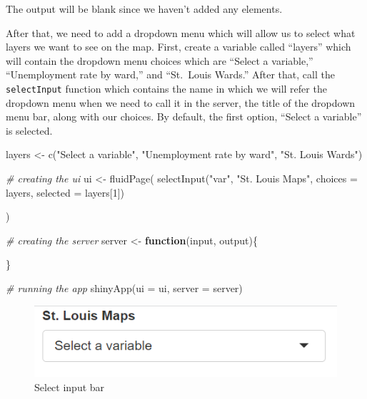 \documentclass[
  krantz2]{krantz}
\makeatletter
\newenvironment{Shaded}{\begin{snugshade}}{\end{snugshade}}
\newcommand{\AttributeTok}[1]{\textcolor[rgb]{0.61,0.61,0.61}{#1}}
\newcommand{\CommentTok}[1]{\textcolor[rgb]{0.37,0.37,0.37}{\textit{#1}}}
\newcommand{\ControlFlowTok}[1]{\textcolor[rgb]{0.27,0.27,0.27}{\textbf{#1}}}
\newcommand{\DecValTok}[1]{\textcolor[rgb]{0.06,0.06,0.06}{#1}}
\newcommand{\FunctionTok}[1]{\textcolor[rgb]{0,0,0}{#1}}
\newcommand{\NormalTok}[1]{#1}
\newcommand{\OtherTok}[1]{\textcolor[rgb]{0.37,0.37,0.37}{#1}}
\newcommand{\StringTok}[1]{\textcolor[rgb]{0.5,0.5,0.5}{#1}}
\newenvironment{kframe}{%
\medskip{}
\setlength{\fboxsep}{.8em}
 \def\at@end@of@kframe{}%
 \ifinner\ifhmode%
  \def\at@end@of@kframe{\end{minipage}}%
  \begin{minipage}{\columnwidth}%
 \fi\fi%
 \def\FrameCommand##1{\hskip\@totalleftmargin \hskip-\fboxsep
 \colorbox{shadecolor}{##1}\hskip-\fboxsep
     \hskip-\linewidth \hskip-\@totalleftmargin \hskip\columnwidth}%
 \MakeFramed {\advance\hsize-\width
   \@totalleftmargin\z@ \linewidth\hsize
   \@setminipage}}%
 {\par\unskip\endMakeFramed%
 \at@end@of@kframe}
\renewenvironment{Shaded}{\begin{kframe}}{\end{kframe}}
\makeatother
\begin{document}
The output will be blank since we haven't added any elements.

After that, we need to add a dropdown menu which will allow us to select what layers we want to see on the map. First, create a variable called ``layers'' which will contain the dropdown menu choices which are ``Select a variable,'' ``Unemployment rate by ward,'' and ``St.~Louis Wards.'' After that, call the \texttt{selectInput} function which contains the name in which we will refer the dropdown menu when we need to call it in the server, the title of the dropdown menu bar, along with our choices. By default, the first option, ``Select a variable'' is selected.

\begin{Shaded}
\begin{Highlighting}[]
\NormalTok{layers }\OtherTok{\textless{}{-}} \FunctionTok{c}\NormalTok{(}\StringTok{"Select a variable"}\NormalTok{, }\StringTok{"Unemployment rate by ward"}\NormalTok{, }\StringTok{"St. Louis Wards"}\NormalTok{)}

\CommentTok{\# creating the ui}
\NormalTok{ui }\OtherTok{\textless{}{-}} \FunctionTok{fluidPage}\NormalTok{(}
   \FunctionTok{selectInput}\NormalTok{(}\StringTok{"var"}\NormalTok{, }\StringTok{"St. Louis Maps"}\NormalTok{, }\AttributeTok{choices =}\NormalTok{ layers, }\AttributeTok{selected =}\NormalTok{ layers[}\DecValTok{1}\NormalTok{])}

\NormalTok{)}

\CommentTok{\# creating the server}
\NormalTok{server }\OtherTok{\textless{}{-}} \ControlFlowTok{function}\NormalTok{(input, output)\{}

\NormalTok{\}}

\CommentTok{\# running the app}
\FunctionTok{shinyApp}\NormalTok{(}\AttributeTok{ui =}\NormalTok{ ui, }\AttributeTok{server =}\NormalTok{ server)}
\end{Highlighting}
\end{Shaded}

\begin{figure}
\centering
\includegraphics{images/stl_shiny1.png}
\caption{Select input bar}
\end{figure}
\end{document}
